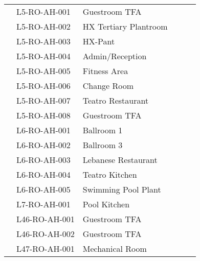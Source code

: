\begin{table}[htbp]
\begin{tabular}{lll c c p{1.8cm}}
\midrule
\inc	 &L5-RO-AH-001	 &Guestroom TFA	    &\checkmark	 	   && \\
\inc	 &L5-RO-AH-002	 &HX Tertiary Plantroom	 &\checkmark	 && \\
\inc	 &L5-RO-AH-003	 &HX-Pant	 &\checkmark	 	               & & \\
\inc	 &L5-RO-AH-004	 &Admin/Reception	&\checkmark  &&  	 \\
\inc	 &L5-RO-AH-005	 &Fitness Area	 &\checkmark	 	 &&\\
\inc	 &L5-RO-AH-006	 &Change Room	&\checkmark	 	 &\\
\inc	 &L5-RO-AH-007	 &Teatro Restaurant	 &\checkmark	 &&\\	 
\inc	 &L5-RO-AH-008    & Guestroom TFA	 &\checkmark  &&\\	 	 

\midrule
\inc	 &L6-RO-AH-001	 &Ballroom 1	           &\checkmark	 	         &&\\
\inc	 &L6-RO-AH-002	 &Ballroom 3	           &\checkmark	 	         &&\\
\inc	 &L6-RO-AH-003	 &Lebanese Restaurant	 &\checkmark	 	         &&\\
\inc	 &L6-RO-AH-004	 &Teatro Kitchen	    &\checkmark	 	         &&\\
\inc	 &L6-RO-AH-005	 &Swimming Pool Plant	 &\checkmark	 	         &&\\

\midrule
\inc	 &L7-RO-AH-001	 &Pool Kitchen	    &\checkmark     &&\\
\midrule
\inc	    &L46-RO-AH-001 &Guestroom TFA	 &\checkmark	 	 &&\\
\inc	 	 &L46-RO-AH-002 &Guestroom TFA	 &\checkmark	 	 &&\\
\midrule
\inc	    &L47-RO-AH-001 &Mechanical Room	 &\checkmark	 	 &&\\

\bottomrule
\end{tabular}

\end{table}





